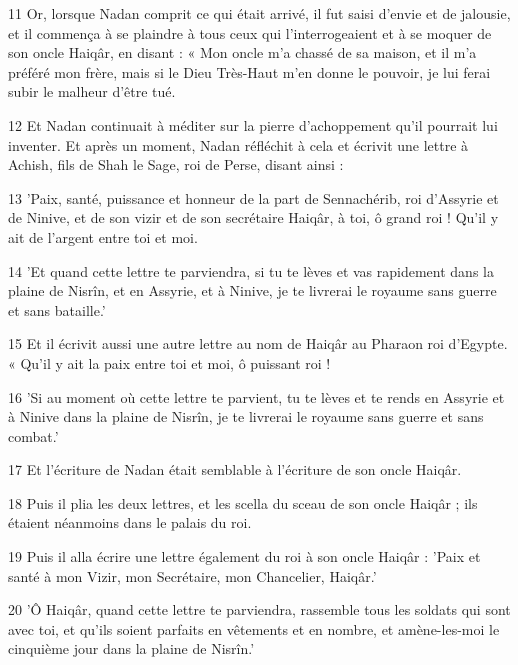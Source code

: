 \par 11 Or, lorsque Nadan comprit ce qui était arrivé, il fut saisi d'envie et de jalousie, et il commença à se plaindre à tous ceux qui l'interrogeaient et à se moquer de son oncle Haiqâr, en disant : « Mon oncle m'a chassé de sa maison, et il m'a préféré mon frère, mais si le Dieu Très-Haut m'en donne le pouvoir, je lui ferai subir le malheur d'être tué.

\par 12 Et Nadan continuait à méditer sur la pierre d'achoppement qu'il pourrait lui inventer. Et après un moment, Nadan réfléchit à cela et écrivit une lettre à Achish, fils de Shah le Sage, roi de Perse, disant ainsi :

\par 13 'Paix, santé, puissance et honneur de la part de Sennachérib, roi d'Assyrie et de Ninive, et de son vizir et de son secrétaire Haiqâr, à toi, ô grand roi ! Qu'il y ait de l'argent entre toi et moi.

\par 14 'Et quand cette lettre te parviendra, si tu te lèves et vas rapidement dans la plaine de Nisrîn, et en Assyrie, et à Ninive, je te livrerai le royaume sans guerre et sans bataille.'

\par 15 Et il écrivit aussi une autre lettre au nom de Haiqâr au Pharaon roi d'Egypte. « Qu'il y ait la paix entre toi et moi, ô puissant roi !

\par 16 'Si au moment où cette lettre te parvient, tu te lèves et te rends en Assyrie et à Ninive dans la plaine de Nisrîn, je te livrerai le royaume sans guerre et sans combat.'

\par 17 Et l'écriture de Nadan était semblable à l'écriture de son oncle Haiqâr.

\par 18 Puis il plia les deux lettres, et les scella du sceau de son oncle Haiqâr ; ils étaient néanmoins dans le palais du roi.

\par 19 Puis il alla écrire une lettre également du roi à son oncle Haiqâr : 'Paix et santé à mon Vizir, mon Secrétaire, mon Chancelier, Haiqâr.'

\par 20 'Ô Haiqâr, quand cette lettre te parviendra, rassemble tous les soldats qui sont avec toi, et qu'ils soient parfaits en vêtements et en nombre, et amène-les-moi le cinquième jour dans la plaine de Nisrîn.'

